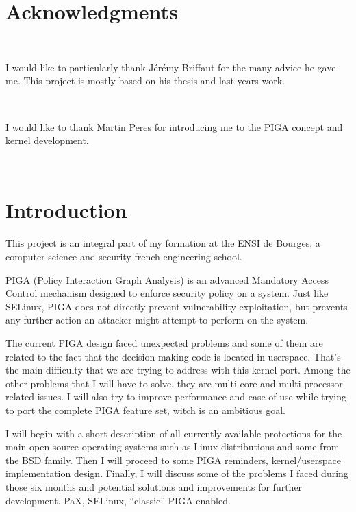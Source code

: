 \documentclass[pdftex,a4paper,titlepage,11pt]{article}
\begin{document}
\section*{Acknowledgments}

~

I would like to particularly thank Jérémy Briffaut for the many advice he gave
me. This project is mostly based on his thesis and last years work.

~

I would like to thank Martin Peres for introducing me to the PIGA concept and
kernel development.

~

\newpage

\tableofcontents

\newpage

\listoffigures

\newpage

\section*{Introduction} 

This project is an integral part of my formation at the ENSI de Bourges, a
computer science and security french engineering school.

\bigskip

PIGA (Policy Interaction Graph Analysis) is an advanced Mandatory Access Control
mechanism designed to enforce security policy on a system. Just like SELinux,
PIGA does not directly prevent vulnerability exploitation, but prevents any
further action an attacker might attempt to perform on the system.

\bigskip

The current PIGA design faced unexpected problems and some of them are related
to the fact that the decision making code is located in userspace. That's the
main difficulty that we are trying to address with this kernel port. Among the
other problems that I will have to solve, they are multi-core and
multi-processor related issues. I will also try to improve performance and ease
of use while trying to port the complete PIGA feature set, witch is an ambitious
goal.

\bigskip

I will begin with a short description of all currently available protections for
the main open source operating systems such as Linux distributions and some from
the BSD family. Then I will proceed to some PIGA reminders, kernel/userspace
implementation design. Finally, I will discuss some of the problems I faced
during those six months and potential solutions and improvements for further
development.
PaX, SELinux, ``classic'' PIGA enabled.
\end{document}
